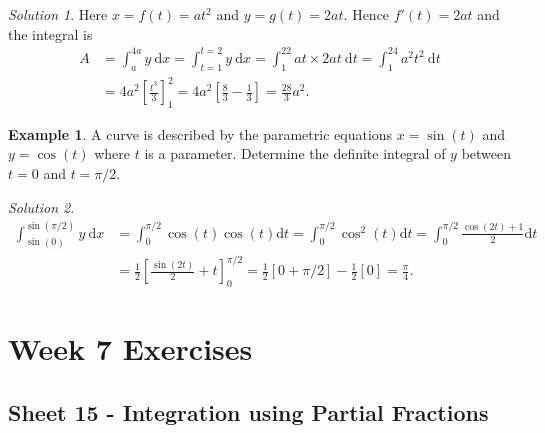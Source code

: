 \documentclass[
  english,
  11pt,
  oneside]{book}
\newcommand{\slide}{}
\theoremstyle{definition}
\theoremstyle{definition}
\newtheorem{example}{Example}[chapter]
\theoremstyle{definition}
\theoremstyle{definition}
\theoremstyle{remark}
\newtheorem*{solution}{Solution}
\begin{document}
\begin{solution}
Here \(x=f(t)=at^2\) and \(y=g(t)=2at\). Hence \(f'(t) = 2at\) and the integral is
\begin{align*}
A &= \int_a^{4a} y\ \mathrm{d}x = \int_{t=1}^{t=2}y\ \mathrm{d}x = \int_1^22at\times 2at\ \mathrm{d}t = \int_1^24a^2t^2\ \mathrm{d}t\\
&= 4a^2\left[\frac{t^3}3\right]_1^2 = 4a^2\left[\frac 83-\frac13\right]=\frac{28}3a^2.
\end{align*}
\end{solution}

\slide

\begin{example}
A curve is described by the parametric equations \(x = \sin(t)\) and \(y = \cos(t)\) where \(t\) is a parameter. Determine the definite integral of \(y\) between \(t = 0\) and \(t = \pi/2\).
\end{example}

\begin{solution}
\begin{align*}
\int_{\sin(0)}^{\sin(\pi/2)}y\ \mathrm{d}x& = \int_0^{\pi/2}\cos(t)\cos(t)\mathrm{d}t = \int_0^{\pi/2}\cos^2(t)\mathrm{d}t = \int_0^{\pi/2}\frac{\cos(2t)+1}{2}\mathrm{d}t\\
& = \frac12\left[\frac{\sin(2t)}2+t\right]_0^{\pi/2} = \frac12\left[0+\pi/2\right]-\frac12\left[0\right]=\frac{\pi}4.
\end{align*}
\end{solution}

\chapter*{Week 7 Exercises}\label{week-7-exercises}

\section{Sheet 15 - Integration using Partial Fractions}\label{sheet-15---integration-using-partial-fractions}
\end{document}
